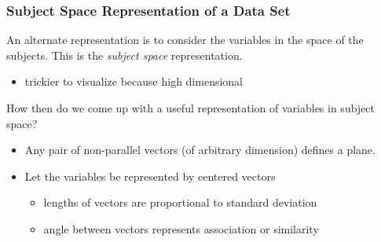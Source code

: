 \documentclass{beamer}
\begin{document}
\begin{frame}
  \frametitle{Subject Space Representation of a Data Set}

\begin{small}

An alternate representation is to consider the variables in the space of the subjects. This is the \emph{subject space} representation.
\begin{itemize}
\item trickier to visualize because high dimensional
\end{itemize}

How then do we come up with a useful representation of variables in subject space?
\begin{itemize}
 \item Any pair of non-parallel vectors (of arbitrary dimension) defines a plane.
 \item Let the variables be represented by centered vectors
 \begin{itemize}
    \item lengths of vectors are proportional to standard deviation
 	\item angle between vectors represents association or similarity
 \end{itemize}
\end{itemize}
\end{small}

\begin{center}

\end{center}


\end{frame}
\end{document}
